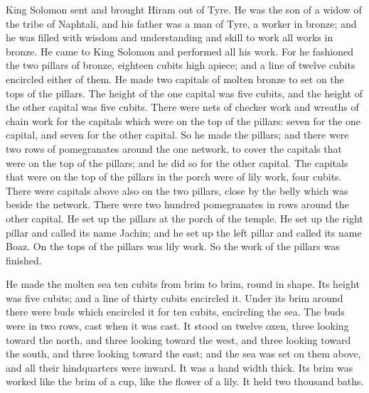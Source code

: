  King Solomon sent and brought Hiram out of Tyre.
 He was the son of a widow of the tribe of Naphtali, and
his father was a man of Tyre, a worker in bronze; and he was filled with
wisdom and understanding and skill to work all works in bronze. He came
to King Solomon and performed all his work.  For he
fashioned the two pillars of bronze, eighteen cubits high apiece; and a
line of twelve cubits encircled either of them.  He made
two capitals of molten bronze to set on the tops of the pillars. The
height of the one capital was five cubits, and the height of the other
capital was five cubits.  There were nets of checker work
and wreaths of chain work for the capitals which were on the top of the
pillars: seven for the one capital, and seven for the other capital.
 So he made the pillars; and there were two rows of
pomegranates around the one network, to cover the capitals that were on
the top of the pillars; and he did so for the other capital.
 The capitals that were on the top of the pillars in the
porch were of lily work, four cubits.  There were
capitals above also on the two pillars, close by the belly which was
beside the network. There were two hundred pomegranates in rows around
the other capital.  He set up the pillars at the porch of
the temple. He set up the right pillar and called its name Jachin; and
he set up the left pillar and called its name Boaz.  On
the tops of the pillars was lily work. So the work of the pillars was
finished.

 He made the molten sea ten cubits from brim to brim,
round in shape. Its height was five cubits; and a line of thirty cubits
encircled it.  Under its brim around there were buds
which encircled it for ten cubits, encircling the sea. The buds were in
two rows, cast when it was cast.  It stood on twelve
oxen, three looking toward the north, and three looking toward the west,
and three looking toward the south, and three looking toward the east;
and the sea was set on them above, and all their hindquarters were
inward.  It was a hand width thick. Its brim was worked
like the brim of a cup, like the flower of a lily. It held two thousand
baths.

